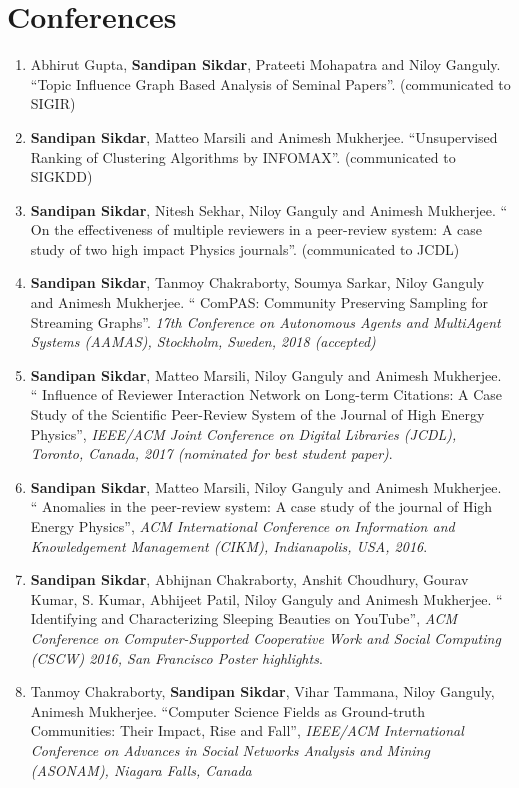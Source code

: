 \section*{Conferences}
\begin{enumerate}

\item Abhirut Gupta, {\bf Sandipan Sikdar}, Prateeti Mohapatra and Niloy Ganguly. ``Topic Influence Graph Based Analysis of Seminal Papers''. (communicated to SIGIR) 

\item  {\bf Sandipan Sikdar}, Matteo Marsili and Animesh Mukherjee. ``Unsupervised Ranking of Clustering Algorithms by INFOMAX''. (communicated to SIGKDD)

\item  {\bf Sandipan Sikdar}, Nitesh Sekhar, Niloy Ganguly and Animesh Mukherjee. `` On the effectiveness of multiple reviewers in a peer-review system: A case study of two high impact Physics journals''. (communicated to JCDL)

\item  {\bf Sandipan Sikdar}, Tanmoy Chakraborty, Soumya Sarkar, Niloy Ganguly and Animesh Mukherjee. `` ComPAS: Community Preserving Sampling for Streaming Graphs''. {\em 17th Conference on Autonomous Agents and MultiAgent Systems (AAMAS), Stockholm, Sweden, 2018 (accepted)}

\item  {\bf Sandipan Sikdar}, Matteo Marsili, Niloy Ganguly and Animesh Mukherjee. `` Influence of Reviewer Interaction Network on Long-term Citations: A Case Study of the Scientific Peer-Review System of the Journal of High Energy Physics'', 
  {\em IEEE/ACM Joint Conference on Digital Libraries (JCDL), Toronto, Canada, 2017 (nominated for best student paper)}.
  
\item  {\bf Sandipan Sikdar}, Matteo Marsili, Niloy Ganguly and Animesh Mukherjee. `` Anomalies in the peer-review system: A case study of the journal of High Energy Physics'', {\em ACM International Conference on 
Information and Knowledgement Management (CIKM), Indianapolis, USA, 2016}.

\item  {\bf Sandipan Sikdar}, Abhijnan Chakraborty, Anshit Choudhury, Gourav Kumar, S. Kumar, Abhijeet Patil, Niloy Ganguly and Animesh Mukherjee. `` Identifying and Characterizing Sleeping Beauties on YouTube'', {\em ACM Conference on Computer-Supported Cooperative Work and Social Computing (CSCW) 2016, San Francisco Poster highlights}.

\item Tanmoy Chakraborty, {\bf Sandipan Sikdar}, Vihar Tammana, Niloy Ganguly, Animesh Mukherjee. ``Computer Science Fields as Ground-truth Communities: Their Impact, Rise and Fall'',  {\em IEEE/ACM International Conference on Advances in Social Networks Analysis and Mining (ASONAM), Niagara Falls, Canada}

\end{enumerate}

